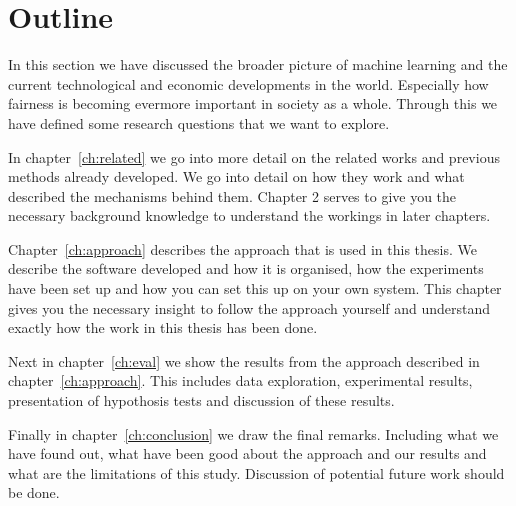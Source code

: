 \section{Outline}
\label{sec:intro:outline}

In this section we have discussed the broader picture of machine learning and the current technological and economic developments in the world. Especially how fairness is becoming evermore important in society as a whole. Through this we have defined some research questions that we want to explore.

In chapter~\ref{ch:related} we go into more detail on the related works and previous methods already developed. We go into detail on how they work and what described the mechanisms behind them. Chapter 2 serves to give you the necessary background knowledge to understand the workings in later chapters.

Chapter~\ref{ch:approach} describes the approach that is used in this thesis. We describe the software developed and how it is organised, how the experiments have been set up and how you can set this up on your own system. This chapter gives you the necessary insight to follow the approach yourself and understand exactly how the work in this thesis has been done.

Next in chapter~\ref{ch:eval} we show the results from the approach described in chapter~\ref{ch:approach}. This includes data exploration, experimental results, presentation of hypothosis tests and discussion of these results. 

Finally in chapter~\ref{ch:conclusion} we draw the final remarks. Including what we have found out, what have been good about the approach and our results and what are the limitations of this study. Discussion of potential future work should be done.

